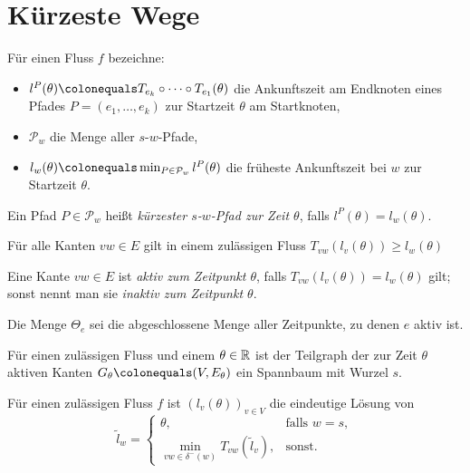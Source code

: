\section{Kürzeste Wege}

\begin{frame}
	\begin{definition}
		Für einen Fluss $f$ bezeichne:
		\begin{itemize}[label=\color{darkblue}$\bullet$]
			\item\pause $l^P(\theta)\colonequals T_{e_k}\circ\dots\circ T_{e_1}(\theta)$ die Ankunftszeit am Endknoten eines Pfades $P=(e_1,\dots,e_k)$ zur Startzeit $\theta$ am Startknoten,
			\item\pause $\mathcal{P}_w$ die Menge aller $s$-$w$-Pfade,
			\item\pause $l_w(\theta) \colonequals \min_{P\in\mathcal{P}_w} l^P(\theta)$ die früheste Ankunftszeit bei $w$ zur Startzeit $\theta$.
		\end{itemize}
	\pause Ein Pfad $P\in \mathcal{P}_w$ heißt \emph{kürzester $s$-$w$-Pfad zur Zeit $\theta$}, falls $l^P(\theta)=l_w(\theta)$.
	\end{definition}
	\pause\begin{lemma}[Dreiecksungleichung]
		Für alle Kanten $vw\in E$ gilt in einem zulässigen Fluss $T_{vw}(l_v(\theta))\geq l_w(\theta)$
	\end{lemma}
\end{frame}

\begin{frame}
	\begin{definition}
		Eine Kante $vw\in E$ ist \emph{aktiv zum Zeitpunkt $\theta$}, falls $T_{vw}(l_v(\theta)) = l_w(\theta)$ gilt; sonst nennt man sie \emph{inaktiv zum Zeitpunkt $\theta$}.
		
		Die Menge $\Theta_e$ sei die abgeschlossene Menge aller Zeitpunkte, zu denen $e$ aktiv ist.
	\end{definition}
	\pause\begin{lemma}
		Für einen zulässigen Fluss und einem $\theta\in\mathbb{R}$ ist der Teilgraph der zur Zeit $\theta$ aktiven Kanten $G_\theta\colonequals(V, E_\theta)$ ein Spannbaum mit Wurzel $s$.
	\end{lemma}
	\pause\begin{proposition}
			Für einen zulässigen Fluss $f$ ist $(l_v(\theta))_{v\in V}$ die eindeutige Lösung von
		\[ \tilde{l}_w = \begin{cases}
		\theta, & \text{falls } w=s, \\
		\min\limits_{vw\in \delta^-(w)} T_{vw}(\tilde{l}_v), & \text{sonst}.
		\end{cases} \]
	\end{proposition}
\end{frame}